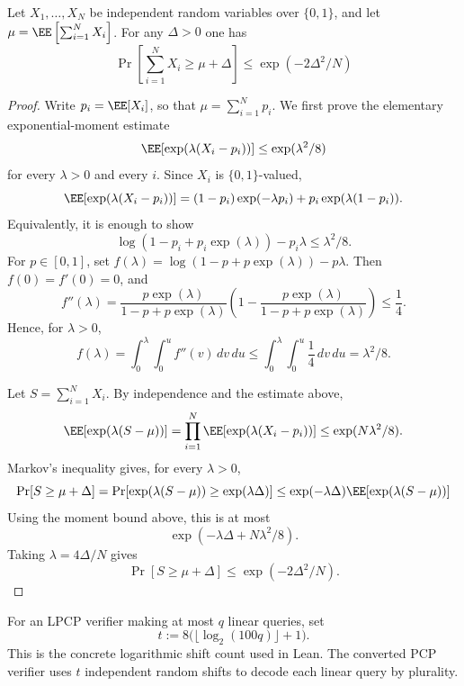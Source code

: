 \begin{lemma}
\label{LPCPToPCP.chernoff_bound}
\leanok
  Let $X_1,\dots, X_N$ be independent random variables over $\{0,1\}$, and let $\mu=\EE\left[\sum_{i = 1}^N X_i\right]$. For any $\Delta > 0$ one has
  \begin{equation*}
    \Pr\left[\sum_{i = 1}^N X_i \ge \mu+\Delta\right] \le \exp(-2\Delta^2/N)
  \end{equation*}
\end{lemma}
\begin{proof}\leanok
  Write $p_i=\EE[X_i]$, so that $\mu=\sum_{i=1}^N p_i$. We first prove the elementary exponential-moment estimate
  \[
    \EE[\exp(\lambda(X_i-p_i))]\le \exp(\lambda^2/8)
  \]
  for every $\lambda>0$ and every $i$. Since $X_i$ is $\{0,1\}$-valued,
  \[
    \EE[\exp(\lambda(X_i-p_i))]
    = (1-p_i)\exp(-\lambda p_i)+p_i\exp(\lambda(1-p_i)).
  \]
  Equivalently, it is enough to show
  \[
    \log(1-p_i+p_i\exp(\lambda))-p_i\lambda \le \lambda^2/8.
  \]
  For $p\in[0,1]$, set $f(\lambda)=\log(1-p+p\exp(\lambda))-p\lambda$. Then $f(0)=f'(0)=0$, and
  \[
    f''(\lambda)
    = \frac{p\exp(\lambda)}{1-p+p\exp(\lambda)}
      \left(1-\frac{p\exp(\lambda)}{1-p+p\exp(\lambda)}\right)
    \le \frac14.
  \]
  Hence, for $\lambda>0$,
  \[
    f(\lambda)
    = \int_0^\lambda\int_0^u f''(v)\,dv\,du
    \le \int_0^\lambda\int_0^u \frac14\,dv\,du
    = \lambda^2/8.
  \]

  Let $S=\sum_{i=1}^N X_i$. By independence and the estimate above,
  \[
    \EE[\exp(\lambda(S-\mu))]
    = \prod_{i=1}^N \EE[\exp(\lambda(X_i-p_i))]
    \le \exp(N\lambda^2/8).
  \]
  Markov's inequality gives, for every $\lambda>0$,
  \[
    \Pr[S\ge \mu+\Delta]
    = \Pr[\exp(\lambda(S-\mu))\ge \exp(\lambda\Delta)]
    \le \exp(-\lambda\Delta)\EE[\exp(\lambda(S-\mu))]
  \]
  Using the moment bound above, this is at most
  \[
    \exp(-\lambda\Delta+N\lambda^2/8).
  \]
  Taking $\lambda=4\Delta/N$ gives
  \[
    \Pr[S\ge \mu+\Delta]\le \exp(-2\Delta^2/N).
  \]
\end{proof}

\begin{definition}
\label{LPCPToPCP.numShifts}
\leanok
For an LPCP verifier making at most \(q\) linear queries, set
\[
  t := 8\bigl(\lfloor \log_2(100q)\rfloor+1\bigr).
\]
This is the concrete logarithmic shift count used in Lean. The converted PCP
verifier uses \(t\) independent random shifts to decode each linear query by
plurality.
\end{definition}

